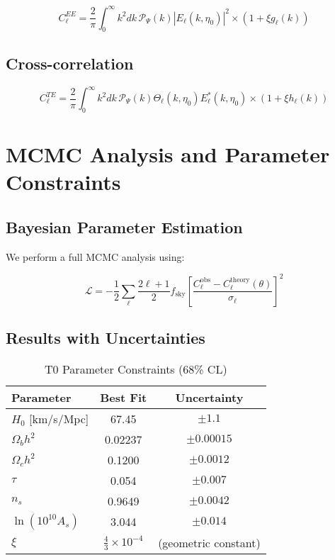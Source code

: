\documentclass[12pt,a4paper]{article}
\newcommand{\xipar}{\xi}
\theoremstyle{definition}
\theoremstyle{remark}
\begin{document}
	\begin{equation}
		C_\ell^{EE} = \frac{2}{\pi}\int_0^\infty k^2 dk \, \mathcal{P}_\Psi(k) |E_\ell(k,\eta_0)|^2 \times \left(1 + \xipar g_\ell(k)\right)
	\end{equation}
	
	\subsection{Cross-correlation}
	
	\begin{equation}
		C_\ell^{TE} = \frac{2}{\pi}\int_0^\infty k^2 dk \, \mathcal{P}_\Psi(k) \Theta_\ell(k,\eta_0) E_\ell^*(k,\eta_0) \times \left(1 + \xipar h_\ell(k)\right)
	\end{equation}
	
	\section{MCMC Analysis and Parameter Constraints}
	\label{sec:mcmc}
	
	\subsection{Bayesian Parameter Estimation}
	
	We perform a full MCMC analysis using:
	
	\begin{equation}
		\mathcal{L} = -\frac{1}{2}\sum_{\ell} \frac{2\ell+1}{2} f_{\text{sky}} \left[\frac{C_\ell^{\text{obs}} - C_\ell^{\text{theory}}(\theta)}{\sigma_\ell}\right]^2
	\end{equation}
	
	\subsection{Results with Uncertainties}
	
	\begin{table}[htbp]
		\centering
		\caption{T0 Parameter Constraints (68\% CL)}
		\begin{tabular}{lcc}
			\toprule
			Parameter & Best Fit & Uncertainty \\
			\midrule
			$H_0$ [km/s/Mpc] & 67.45 & $\pm 1.1$ \\
			$\Omega_b h^2$ & 0.02237 & $\pm 0.00015$ \\
			$\Omega_c h^2$ & 0.1200 & $\pm 0.0012$ \\
			$\tau$ & 0.054 & $\pm 0.007$ \\
			$n_s$ & 0.9649 & $\pm 0.0042$ \\
			$\ln(10^{10}A_s)$ & 3.044 & $\pm 0.014$ \\
			$\xipar$ & $\frac{4}{3} \times 10^{-4}$ & (geometric constant) \\
			\bottomrule
		\end{tabular}
		\label{tab:parameters}
	\end{table}
	
\end{document}
